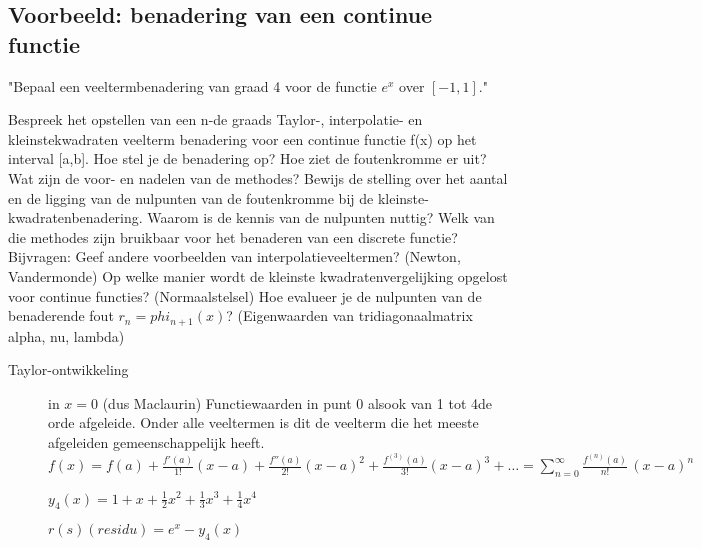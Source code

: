 \subsection{Voorbeeld: benadering van een continue functie}
"Bepaal een veeltermbenadering van graad 4 voor de functie $e^x$ over $[-1,1]$."

\begin{exam} Bespreek het opstellen van een n-de graads Taylor-, interpolatie- en kleinstekwadraten veelterm benadering voor een continue functie f(x) op het interval [a,b]. Hoe stel je de benadering op? Hoe ziet de foutenkromme er uit? Wat zijn de voor- en nadelen van de methodes? Bewijs de stelling over het aantal en de ligging van de nulpunten van de foutenkromme bij de kleinste-kwadratenbenadering. Waarom is de kennis van de nulpunten nuttig? Welk van die methodes zijn bruikbaar voor het benaderen van een discrete functie? Bijvragen: Geef andere voorbeelden van interpolatieveeltermen? (Newton, Vandermonde) Op welke manier wordt de kleinste kwadratenvergelijking opgelost voor continue functies? (Normaalstelsel) Hoe evalueer je de nulpunten van de benaderende fout $r_n = phi_{n+1}(x)$? (Eigenwaarden van tridiagonaalmatrix alpha, nu, lambda)
	\begin{description}
		\item [Taylor-ontwikkeling] in $x=0$ (dus Maclaurin)
		      Functiewaarden in punt 0 alsook van 1 tot 4de orde afgeleide. Onder alle veeltermen is dit de veelterm die het meeste afgeleiden gemeenschappelijk heeft.
		      ${\displaystyle f(x)=f(a)+{\frac {f'(a)}{1!}}(x-a)+{\frac {f''(a)}{2!}}(x-a)^{2}+{\frac {f^{(3)}(a)}{3!}}(x-a)^{3}+\ldots =\sum _{n=0}^{\infty }{\frac {f^{(n)}(a)}{n!}}\,(x-a)^{n}}$

		      ${\displaystyle y_4(x) = 1+x+{\tfrac {1}{2}}x^{2}+{\tfrac {1}{3}}x^{3}+{\tfrac {1}{4}}x^{4} \!}$

		      $ r(s) (residu) = e^x - y_4(x) $


\end{description}
\end{exam}
